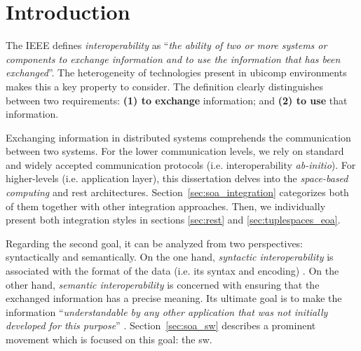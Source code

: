 \section{Introduction}
\label{sec:soa_intro}



The IEEE \citep{_ieee_1990} defines \emph{interoperability} as ``\emph{the ability of two or more systems or components to exchange information and to use the information that has been exchanged}''.
The heterogeneity of technologies present in \ac{ubicomp} environments makes this a key property to consider.
The definition clearly distinguishes between two requirements: %
\textbf{(1) to exchange} information; and
\textbf{(2) to use} that information. %

\medskip

Exchanging information in distributed systems comprehends the communication between two systems.
For the lower communication levels, we rely on standard and widely accepted communication protocols (i.e. interoperability \emph{ab-initio}). %
For higher-levels (i.e. application layer), this dissertation delves into the \emph{space-based computing} and \ac{rest} architectures.
Section~\ref{sec:soa_integration} categorizes both of them together with other integration approaches.
Then, we individually present both integration styles in sections \ref{sec:rest} and \ref{sec:tuplespaces_eoa}.

\medskip

Regarding the second goal, it can be analyzed from two perspectives: syntactically and semantically.
On the one hand, \emph{syntactic interoperability} is associated with the format of the data (i.e. its syntax and encoding) \citep{van_der_veer_achieving_2006}. %
On the other hand, \emph{semantic interoperability} is concerned with ensuring that the exchanged information has a precise meaning.
Its ultimate goal is to make the information ``\emph{understandable by any other application that was not initially developed for this purpose}'' \citep{_european_2004}.
Section~\ref{sec:soa_sw} describes a prominent movement which is focused on this goal: the \acl{sw}. %





